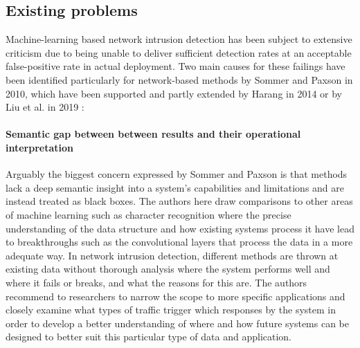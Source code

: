 \documentclass[sigconf]{acmart}
\begin{document}
\subsection{Existing problems}

Machine-learning based network intrusion detection has been subject to extensive criticism due to being unable to deliver sufficient detection rates at an acceptable false-positive rate in actual deployment. Two main causes for these failings have been identified particularly for network-based methods by Sommer and Paxson \cite{sommer2010outside} in 2010, which have been supported and partly extended by Harang \cite{harang2014bridging} in 2014 or by Liu et al. in 2019 \cite{liu2019machine}:


\paragraph{Semantic gap between between results and their operational interpretation}

Arguably the biggest concern expressed by Sommer and Paxson is that methods lack a deep semantic insight into a system's capabilities and limitations and are instead treated as black boxes. The authors here draw comparisons to other areas of machine learning such as character recognition where the precise understanding of the data structure and how existing systems process it have lead to breakthroughs such as the convolutional layers that process the data in a more adequate way. In network intrusion detection, different methods are thrown at existing data without thorough analysis where the system performs well and where it fails or breaks, and what the reasons for this are. The authors recommend to researchers to narrow the scope to more specific applications and closely examine what types of traffic trigger which responses by the system in order to develop a better understanding of where and how future systems can be designed to better suit this particular type of data and application. 


%
%
%
%
%
\end{document}

